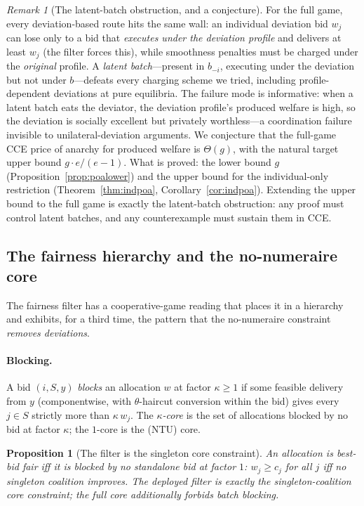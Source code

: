 \documentclass[11pt]{article}
\newtheorem{proposition}{Proposition}
\theoremstyle{remark}
\newtheorem{remark}{Remark}
\begin{document}
\begin{remark}[The latent-batch obstruction, and a conjecture]
\label{rem:latentbatch}
For the full game, every deviation-based route hits the same wall: an
individual deviation bid $w_j$ can lose only to a bid that
\emph{executes under the deviation profile} and delivers at least $w_j$
(the filter forces this), while smoothness penalties must be charged
under the \emph{original} profile. A \emph{latent batch}---present in
$b_{-i}$, executing under the deviation but not under $b$---defeats every
charging scheme we tried, including profile-dependent deviations at pure
equilibria. The failure mode is informative: when a latent batch eats the
deviator, the deviation profile's produced welfare is high, so the
deviation is socially excellent but privately worthless---a coordination
failure invisible to unilateral-deviation arguments. We conjecture that
the full-game CCE price of anarchy for produced welfare is $\Theta(g)$,
with the natural target upper bound $g\cdot e/(e-1)$. What is proved: the
lower bound $g$ (Proposition~\ref{prop:poalower}) and the upper bound for
the individual-only restriction (Theorem~\ref{thm:indpoa},
Corollary~\ref{cor:indpoa}). Extending the upper bound to the full game
is exactly the latent-batch obstruction: any proof must control latent
batches, and any counterexample must sustain them in CCE.
\end{remark}

\subsection{The fairness hierarchy and the no-numeraire core}
\label{sec:hierarchy}

The fairness filter has a cooperative-game reading that places it in a
hierarchy and exhibits, for a third time, the pattern that the
no-numeraire constraint \emph{removes deviations}.

\paragraph{Blocking.}
A bid $(i,S,y)$ \emph{blocks} an allocation $w$ at factor $\kappa\ge1$ if
some feasible delivery from $y$ (componentwise, with $\theta$-haircut
conversion within the bid) gives every $j\in S$ strictly more than
$\kappa\,w_j$. The \emph{$\kappa$-core} is the set of allocations blocked
by no bid at factor $\kappa$; the $1$-core is the (NTU) core.

\begin{proposition}[The filter is the singleton core constraint]
\label{prop:singletoncore}
An allocation is best-bid fair iff it is blocked by no \emph{standalone}
bid at factor $1$: $w_j\ge c_j$ for all $j$ iff no singleton coalition
improves. The deployed filter is exactly the singleton-coalition core
constraint; the full core additionally forbids batch blocking.
\end{proposition}
\end{document}
